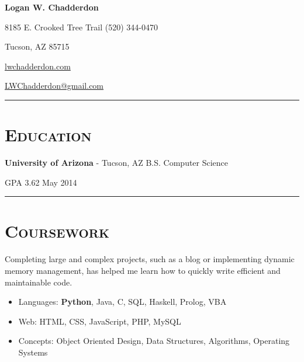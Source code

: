 \documentclass[11pt,letterpaper]{article}
\newcommand{\Hsep}{\vspace{4mm} \hrule \vspace{-1mm}}
\begin{document}
\begin{minipage}{\textwidth}

\begin{center}
\LARGE \bfseries Logan W. Chadderdon
\end{center}

8185 E. Crooked Tree Trail \hfill (520) 344-0470

\vspace{-3mm}
\begin{multicols}{3}
Tucson, AZ 85715 

\begin{center}
\href{http://lwchadderdon.com}{lwchadderdon.com}
\end{center}

\hfill \href{mailto:LWChadderdon@gmail.com}{LWChadderdon@gmail.com}

\end{multicols}


\vspace{-1mm}
\hrule


\section{\scshape Education}
\vspace{-2mm}
{\bfseries University of Arizona} - Tucson, AZ \hfill B.S. Computer Science

GPA 3.62 \hfill May 2014

\Hsep

\section{\scshape Coursework}
\vspace{-2mm}
Completing large and complex projects, such as a blog or implementing dynamic memory management,
has helped me learn how to quickly write efficient and maintainable code.
\vspace{3mm}
\begin{itemize}
 \item Languages: {\bfseries Python}, Java, C, SQL, Haskell, Prolog, VBA
 \item Web: HTML, CSS, JavaScript, PHP, MySQL
 \item Concepts: Object Oriented Design, Data Structures, Algorithms, Operating Systems
\end{itemize}
\vspace{-3mm}

\end{minipage}
\end{document}
